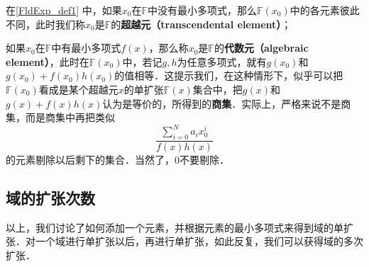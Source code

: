 在\autoref{FldExp_def1} 中，如果$x_0$在$\mathbb{F}$中没有最小多项式，那么$\mathbb{F}(x_0)$中的各元素彼此不同，此时我们称$x_0$是$\mathbb{F}$的\textbf{超越元（transcendental element）}； 

如果$x_0$在$\mathbb{F}$中有最小多项式$f(x)$，那么称$x_0$是$\mathbb{F}$的\textbf{代数元（algebraic element）}，此时在$\mathbb{F}(x_0)$中，若记$g, h$为任意多项式，就有$g(x_0)$和$g(x_0)+f(x_0)h(x_0)$的值相等．这提示我们，在这种情形下，似乎可以把$\mathbb{F}(x_0)$看成是某个超越元$x$的单扩张$\mathbb{F}(x)$集合中，把$g(x)$和$g(x)+f(x)h(x)$认为是等价的，所得到的\textbf{商集}．实际上，严格来说不是商集，而是商集中再把类似$$\frac{\sum_{i=0}^N a_ix_0^i}{f(x)h(x)}$$的元素剔除以后剩下的集合．当然了，$0$不要剔除．

\subsection{域的扩张次数}

以上，我们讨论了如何添加一个元素，并根据元素的最小多项式来得到域的单扩张．对一个域进行单扩张以后，再进行单扩张，如此反复，我们可以获得域的多次扩张．


